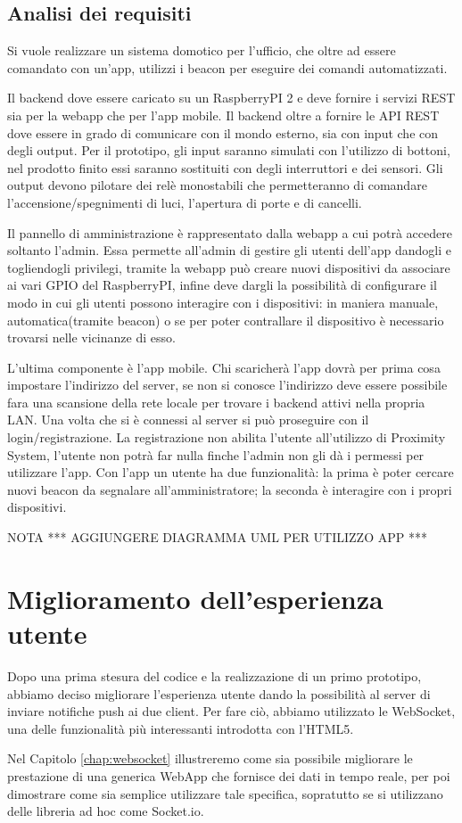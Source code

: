 \subsection{Analisi dei requisiti}
Si vuole realizzare un sistema domotico per l'ufficio, che oltre ad essere comandato con un'app, utilizzi i beacon per eseguire dei comandi automatizzati.

Il backend dove essere caricato su un RaspberryPI 2 e deve fornire i servizi REST sia per la webapp che per l'app mobile. 
Il backend oltre a fornire le API REST dove essere in grado di comunicare con il mondo esterno, sia con input che con degli output.
Per il prototipo, gli input saranno simulati con l'utilizzo di bottoni, nel prodotto finito essi saranno sostituiti con degli interruttori e dei sensori.
Gli output devono pilotare dei relè monostabili che permetteranno di comandare l'accensione/spegnimenti di luci, l'apertura di porte e di cancelli.

Il pannello di amministrazione è rappresentato dalla webapp a cui potrà accedere soltanto l'admin. Essa permette all'admin di gestire gli utenti dell'app dandogli e togliendogli privilegi, tramite la webapp può creare nuovi dispositivi da associare ai vari GPIO del RaspberryPI, infine deve dargli la possibilità di configurare il modo in cui gli utenti possono interagire con i dispositivi: in maniera manuale, automatica(tramite beacon) o se per poter contrallare il dispositivo è necessario trovarsi nelle vicinanze di esso. 

L'ultima componente è l'app mobile. 
Chi scaricherà l'app dovrà per prima cosa impostare l'indirizzo del server, se non si conosce l'indirizzo deve essere possibile fara una scansione della rete locale per trovare i backend attivi nella propria LAN. 
Una volta che si è connessi al server si può proseguire con il login/registrazione. La registrazione non abilita l'utente all'utilizzo di Proximity System, l'utente non potrà far nulla finche l'admin non gli dà i permessi per utilizzare l'app. 
Con l'app un utente ha due funzionalità: la prima è poter cercare nuovi beacon da segnalare all'amministratore; la seconda è interagire con i propri dispositivi.

{\Huge NOTA *** AGGIUNGERE DIAGRAMMA UML PER UTILIZZO APP ***}

\section{Miglioramento dell'esperienza utente}
Dopo una prima stesura del codice e la realizzazione di un primo prototipo,
abbiamo deciso migliorare l'esperienza utente dando la possibilità al server di inviare notifiche push ai due client.
Per fare ciò, abbiamo utilizzato le WebSocket, una delle funzionalità più interessanti introdotta con l'HTML5.

Nel Capitolo \ref{chap:websocket} illustreremo come sia possibile migliorare le  prestazione di una generica WebApp che fornisce dei dati in tempo reale, per poi dimostrare come sia semplice utilizzare tale specifica, sopratutto se si utilizzano delle libreria ad hoc come Socket.io. 
